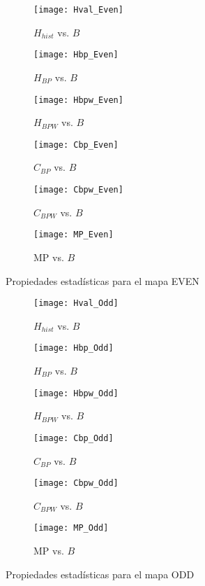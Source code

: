 \begin{figure}[htpb]
	\centering
	\begin{subfigure}[b]{0.49\textwidth}
		\texttt{[image: Hval\_Even]}
		\caption{$H_{hist}$ vs. $B$}
		\label{fig:Hval_Even}
	\end{subfigure}
	\begin{subfigure}[b]{0.49\textwidth}
		\texttt{[image: Hbp\_Even]}
		\caption{$H_{BP}$ vs. $B$}
		\label{fig:Hbp_Even}
	\end{subfigure}
	\begin{subfigure}[b]{0.49\textwidth}
		\texttt{[image: Hbpw\_Even]}
		\caption{$H_{BPW}$ vs. $B$}
		\label{fig:Hbpw_Even}
	\end{subfigure}
	\begin{subfigure}[b]{0.49\textwidth}
		\texttt{[image: Cbp\_Even]}
		\caption{$C_{BP}$ vs. $B$}
		\label{fig:Cbp_Even}
	\end{subfigure}
	\begin{subfigure}[b]{0.49\textwidth}
		\texttt{[image: Cbpw\_Even]}
		\caption{$C_{BPW}$ vs. $B$}
		\label{fig:Cbpw_Even}
	\end{subfigure}
	\begin{subfigure}[b]{0.49\textwidth}
		\texttt{[image: MP\_Even]}
		\caption{MP vs. $B$}
		\label{fig:MP_Even}
	\end{subfigure}
	\caption{Propiedades estadísticas para el mapa EVEN}
	\label{fig:EVEN_QuantiB}
\end{figure}
%
\begin{figure}[htpb]
	\centering
	\begin{subfigure}[b]{0.49\textwidth}
		\texttt{[image: Hval\_Odd]}
		\caption{$H_{hist}$ vs. $B$}
		\label{fig:Hval_Odd}
	\end{subfigure}
	\begin{subfigure}[b]{0.49\textwidth}
		\texttt{[image: Hbp\_Odd]}
		\caption{$H_{BP}$ vs. $B$}
		\label{fig:Hbp_Odd}
	\end{subfigure}
	\begin{subfigure}[b]{0.49\textwidth}
		\texttt{[image: Hbpw\_Odd]}
		\caption{$H_{BPW}$ vs. $B$}
		\label{fig:Hbpw_Odd}
	\end{subfigure}
	\begin{subfigure}[b]{0.49\textwidth}
		\texttt{[image: Cbp\_Odd]}
		\caption{$C_{BP}$ vs. $B$}
		\label{fig:Cbp_Odd}
	\end{subfigure}
	\begin{subfigure}[b]{0.49\textwidth}
		\texttt{[image: Cbpw\_Odd]}
		\caption{$C_{BPW}$ vs. $B$}
		\label{fig:Cbpw_Odd}
	\end{subfigure}
	\begin{subfigure}[b]{0.49\textwidth}
		\texttt{[image: MP\_Odd]}
		\caption{MP vs. $B$}
		\label{fig:MP_Odd}
	\end{subfigure}
	\caption{Propiedades estadísticas para el mapa ODD}
	\label{fig:ODD_QuantiB}
\end{figure}

